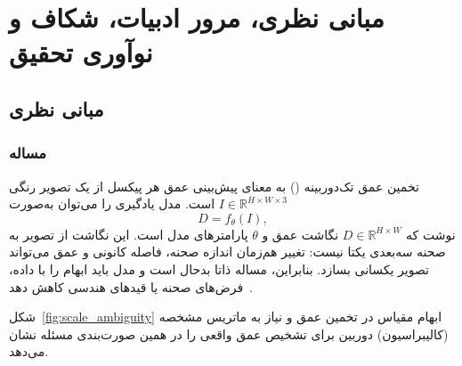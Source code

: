 \chapter{مبانی نظری، مرور ادبیات، شکاف و نوآوری تحقیق}
\thispagestyle{fancy}\clearpage
\label{ch:literature}

\section{مبانی نظری}
\label{sec:ch2_foundations}

\subsection{مساله }
\label{sec:eval_metrics}
تخمین عمق تک‌دوربینه () به معنای پیش‌بینی عمق هر پیکسل از یک تصویر رنگی $I\in\mathbb{R}^{H\times W\times3}$ است. مدل یادگیری را می‌توان به‌صورت
\begin{equation}
 D=f_{\theta}(I),
\end{equation}
نوشت که $D\in\mathbb{R}^{H\times W}$ نگاشت عمق و $\theta$ پارامترهای مدل است. این نگاشت از تصویر به صحنه سه‌بعدی یکتا نیست: تغییر هم‌زمان اندازه صحنه، فاصله کانونی و عمق می‌تواند تصویر یکسانی بسازد. بنابراین، مساله ذاتا بدحال است و مدل باید ابهام را با داده، فرض‌های صحنه یا قیدهای هندسی کاهش دهد~\cite{HartleyZisserman2004,Eigen2014Depth}.

شکل{~\ref{fig:scale_ambiguity}} ابهام مقیاس در تخمین عمق و نیاز به ماتریس مشخصه (کالیبراسیون) دوربین برای تشخیص عمق واقعی را در همین صورت‌بندی مسئله نشان می‌دهد.

